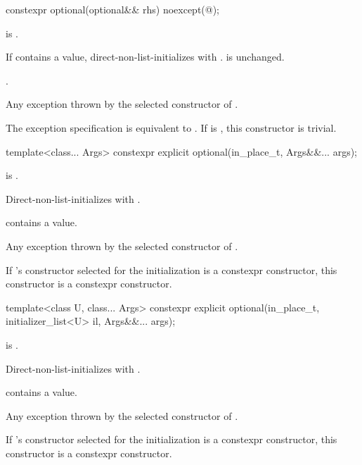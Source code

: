 %
\begin{itemdecl}
constexpr optional(optional&& rhs) noexcept(@\seebelow@);
\end{itemdecl}

\begin{itemdescr}
\pnum
\constraints
{} is .

\pnum
\effects
If  contains a value, direct-non-list-initializes  with .  is unchanged.

\pnum
\ensures
{}.

\pnum
\throws
Any exception thrown by the selected constructor of .

\pnum
\remarks
The exception specification is equivalent to . If  is , this constructor is trivial.
\end{itemdescr}

%
\begin{itemdecl}
template<class... Args>
  constexpr explicit optional(in_place_t, Args&&... args);
\end{itemdecl}

\begin{itemdescr}
\pnum
\constraints
{} is .

\pnum
\effects
Direct-non-list-initializes  with .

\pnum
\ensures
{} contains a value.

\pnum
\throws
Any exception thrown by the selected constructor of .

\pnum
\remarks
If 's constructor selected for the initialization is a constexpr constructor, this constructor is a constexpr constructor.
\end{itemdescr}

%
\begin{itemdecl}
template<class U, class... Args>
  constexpr explicit optional(in_place_t, initializer_list<U> il, Args&&... args);
\end{itemdecl}

\begin{itemdescr}
\pnum
\constraints
{} is .

\pnum
\effects
Direct-non-list-initializes  with .

\pnum
\ensures
{} contains a value.

\pnum
\throws
Any exception thrown by the selected constructor of .

\pnum
\remarks
If 's constructor selected for the initialization is a constexpr constructor, this constructor is a constexpr constructor.
\end{itemdescr}

